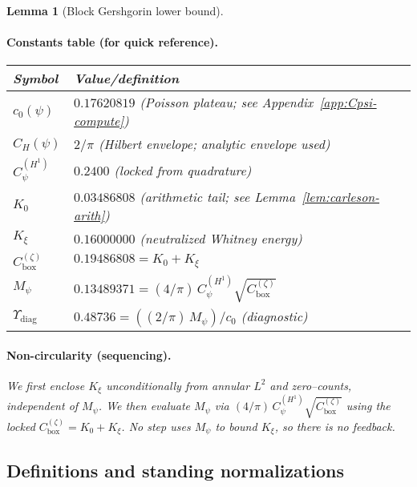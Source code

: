 \documentclass[11pt]{article}
\providecommand{\czeroplateau}{0.17620819}%
\providecommand{\Kxi}{K_\xi}
\providecommand{\CboxZeta}{K_0 + K_\xi}%
\providecommand{\CHone}{2/\pi}%
\providecommand{\CpsiHone}{0.2400}%
\providecommand{\Mpsilocked}{(4/\pi)\,\CpsiHone\,\sqrt{\CboxZeta}}
\providecommand{\UpsilonLocked}{(2/\pi)\,\Mpsilocked/\czeroplateau}%
\renewcommand{\Kxi}{0.16000000}
\renewcommand{\CboxZeta}{0.19486808}
\renewcommand{\Mpsilocked}{0.13489371}
\renewcommand{\UpsilonLocked}{0.48736}
\newtheorem{lemma}{Lemma}[section]
\theoremstyle{definition}
\theoremstyle{remark}
\begin{document}
\begin{lemma}[Block Gershgorin lower bound]
\paragraph{Constants table (for quick reference).}
\begin{center}
\begin{tabular}{ll}
\toprule
Symbol & Value/definition \\
\midrule
$c_0(\psi)$ & $\czeroplateau$ (Poisson plateau; see Appendix~\ref{app:Cpsi-compute}) \\
$C_H(\psi)$ & $\CHone$ (Hilbert envelope; analytic envelope used) \\
$C_\psi^{(H^1)}$ & $\CpsiHone$ (locked from quadrature) \\
$K_0$ & $0.03486808$ (arithmetic tail; see Lemma~\ref{lem:carleson-arith}) \\
$K_\xi$ & $\Kxi$ (neutralized Whitney energy) \\
$C_{\mathrm{box}}^{(\zeta)}$ & $\CboxZeta=K_0+K_\xi$ \\
$M_\psi$ & $\Mpsilocked=(4/\pi)\,C_\psi^{(H^1)}\sqrt{C_{\mathrm{box}}^{(\zeta)}}$ \\
\(\Upsilon_{\mathrm{diag}}\) & $\UpsilonLocked=((2/\pi)\,M_\psi)/c_0$ \quad(\emph{diagnostic})\\
\bottomrule
\end{tabular}
\end{center}





\vspace{1.0cm}
\paragraph{Non-circularity (sequencing).}
We first enclose \(K_\xi\) unconditionally from annular $L^2$ and zero–counts, independent of \(M_\psi\). We then evaluate \(M_\psi\) via \((4/\pi)\,C_\psi^{(H^1)}\sqrt{C_{\mathrm{box}}^{(\zeta)}}\) using the locked \(C_{\mathrm{box}}^{(\zeta)}=K_0+K_\xi\). No step uses \(M_\psi\) to bound \(K_\xi\), so there is no feedback.







\vspace{1.0cm}
\subsection*{Definitions and standing normalizations}


\end{lemma}
\end{document}
